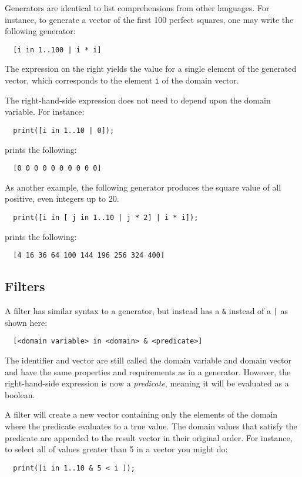 \documentclass{article}
\newcommand{\code}[1]{\texttt{\textmd{#1}}}
\begin{document}
Generators are identical to list comprehensions from other languages. For instance, to generate a
vector of the first 100 perfect squares, one may write the following generator:
\begin{lstlisting}
  [i in 1..100 | i * i]
\end{lstlisting}

The expression on the right yields the value for a single element of the generated vector, which
corresponds to the element \code{i} of the domain vector.

The right-hand-side expression does not need to depend upon the domain variable. For instance:
\begin{lstlisting}
  print([i in 1..10 | 0]);
\end{lstlisting}

prints the following:
\begin{lstlisting}
  [0 0 0 0 0 0 0 0 0 0]
\end{lstlisting}

As another example, the following generator produces the square value of all positive, even integers
up to 20.
\begin{lstlisting}
  print([i in [ j in 1..10 | j * 2] | i * i]);
\end{lstlisting}

prints the following:
\begin{lstlisting}
  [4 16 36 64 100 144 196 256 324 400]
\end{lstlisting}

\subsection{Filters}
A filter has similar syntax to a generator, but instead has a \code{\&} instead of a \code{|} as
shown here:
\begin{lstlisting}
  [<domain variable> in <domain> & <predicate>]
\end{lstlisting}
The identifier and vector are still called the domain variable and domain vector and have the same
properties and requirements as in a generator. However, the right-hand-side expression is now a
\textit{predicate}, meaning it will be evaluated as a boolean.

A filter will create a new vector containing only the elements of the domain where the predicate
evaluates to a true value. The domain values that satisfy the predicate are appended to the result
vector in their original order. For instance, to select all of values greater than 5 in a vector
you might do:
\begin{lstlisting}
  print([i in 1..10 & 5 < i ]);
\end{lstlisting}
\end{document}
